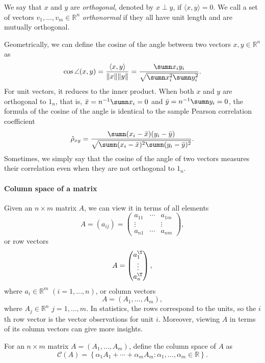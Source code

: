 We say that $x$ and $y$ are {\it orthogonal}, denoted by $x\perp y$, if $\langle x,y \rangle=0$. We call a set of vectors $v_1, \ldots, v_m \in \mathbb{R}^{n}$ {\it orthonormal} if they all have unit length and are mutually orthogonal. 




Geometrically, we can define the cosine of the angle between two vectors $x, y \in \mathbb{R}^n$ as
$$
\cos \angle (x, y) = \frac{ \langle x, y \rangle    }{   \| x \| \| y \|  }
= \frac{  \sumn x_i y_i  }{    \sqrt{  \sumn x_i^2 \sumn y_i^2  }  }.
$$
For unit vectors, it reduces to the inner product. 
When both $x$ and $y$ are orthogonal to $1_n$, that is, $\bar{x} = n^{-1} \sumn x_i =0$ and $\bar{y} = n^{-1} \sumn y_i =0$, the formula of the cosine of the angle is identical to the sample Pearson correlation coefficient
$$
\hat{\rho}_{xy} =  \frac{  \sumn (x_i - \bar{x})  (y_i - \bar{y} )  }{  \sqrt{   \sumn (x_i - \bar{x} ) ^2 \sumn (y_i - \bar{y})^2  }  } .
$$
Sometimes, we simply say that the cosine of the angle of two vectors measures their correlation even when they are not orthogonal to $1_n$. 


\paragraph*{Column space of a matrix}




Given an $n\times m$ matrix $A$, we can view it in terms of all elements 
$$
A = (a_{ij})
= \begin{pmatrix}
a_{11} & \cdots & a_{1m} \\
\vdots &  & \vdots \\
a_{n1} & \cdots & a_{nm}
\end{pmatrix},
$$ 
or row vectors
$$
A = \begin{pmatrix}
a_1^{\T} \\
\vdots \\
a_n^{\T}
\end{pmatrix},
$$
where $a_i \in \mathbb{R}^m$ $(i=1, \ldots, n)$,  or column vectors
$$
A=(A_{1},\ldots,A_{m}),
$$
where $A_j \in \mathbb{R}^n$ $j=1,\ldots, m$. 
In statistics, the rows correspond to the units, so the $i$th row vector is the vector observations for unit $i$. Moreover, viewing $A$ in terms of its column vectors can give more insights. 


\begin{definition}
\label{def::column-space}
For an $n\times m$ matrix $A= (A_{1},\ldots,A_{m})$, define the  column space of $A$ as 
\[
\mathcal{C}(A)=\left\{ \alpha_{1}A_{1}+\cdots+\alpha_{m}A_{m}: \alpha_{1},\ldots,\alpha_{m}\in\mathbb{R}\right\} . 
\]
\end{definition}


